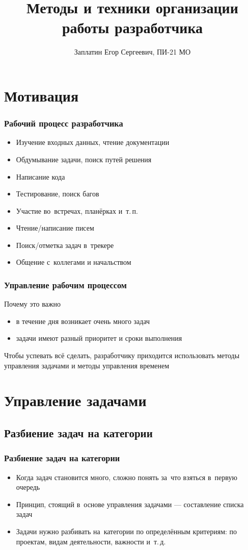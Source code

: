 \documentclass{../industrial-development}
\title{Методы и техники организации работы разработчика}
\author{Заплатин Егор Сергеевич, ПИ-21 МО}
\date{}
\begin{document}
\begin{frame}
  \titlepage
\end{frame}

\section{Мотивация}

\begin{frame} \frametitle{Рабочий процесс разработчика}
  \begin{itemize}
  \item Изучение входных данных, чтение документации
  \item Обдумывание задачи, поиск путей решения
  \item Написание кода
  \item Тестирование, поиск багов
  \item Участие во~встречах, планёрках и~т.\,п.
  \item Чтение/написание писем
  \item Поиск/отметка задач в~трекере
  \item Общение с~коллегами и начальством
  \end{itemize}
\end{frame}

\begin{frame} \frametitle{Управление рабочим процессом}
Почему это важно
  \begin{itemize}
  \item в течение дня возникает очень много задач
  \item задачи имеют разный приоритет и сроки выполнения
  \end{itemize}
  \begin{block}{}
    Чтобы успевать всё сделать, разработчику приходится использовать методы управления задачами и методы управления временем
  \end{block}
\end{frame}

\section{Управление задачами}

\subsection{Разбиение задач на категории}

\begin{frame} \frametitle{Разбиение задач на категории}

  \begin{itemize}
  \item Когда задач становится много, сложно понять за~что взяться в~первую очередь
  \item Принцип, стоящий в~основе управления задачами --- составление списка задач
  \item Задачи нужно разбивать на~категории по определённым критериям: по проектам, видам деятельности, важности и~т.\,д.
  \end{itemize}
\end{frame}
\end{document}

